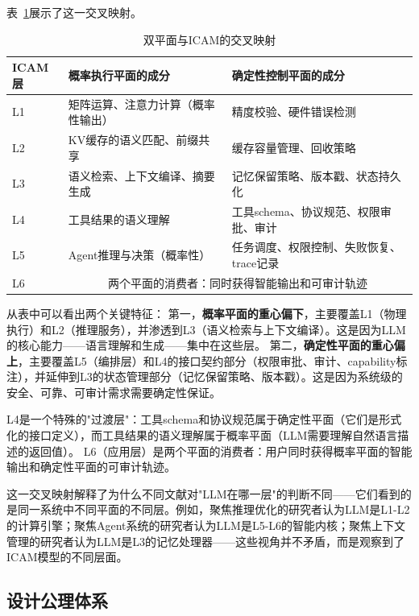 表~\ref{tab:dual-plane-icam}展示了这一交叉映射。

\begin{table}[t]
\centering
\footnotesize
\caption{双平面与ICAM的交叉映射}
\label{tab:dual-plane-icam}
\begin{tabularx}{\textwidth}{p{}p{}p{}}
\toprule
ICAM层 & 概率执行平面的成分 & 确定性控制平面的成分 \\
\midrule
L1 & 矩阵运算、注意力计算（概率性输出） & 精度校验、硬件错误检测 \\
L2 & KV缓存的语义匹配、前缀共享 & 缓存容量管理、回收策略 \\
L3 & 语义检索、上下文编译、摘要生成 & 记忆保留策略、版本戳、状态持久化 \\
L4 & 工具结果的语义理解 & 工具schema、协议规范、权限审批、审计 \\
L5 & Agent推理与决策（概率性） & 任务调度、权限控制、失败恢复、trace记录 \\
L6 & \multicolumn{2}{c}{两个平面的消费者：同时获得智能输出和可审计轨迹} \\
\bottomrule
\end{tabularx}
\end{table}

从表中可以看出两个关键特征：
第一，\textbf{概率平面的重心偏下}，主要覆盖L1（物理执行）和L2（推理服务），并渗透到L3（语义检索与上下文编译）。这是因为LLM的核心能力——语言理解和生成——集中在这些层。
第二，\textbf{确定性平面的重心偏上}，主要覆盖L5（编排层）和L4的接口契约部分（权限审批、审计、capability标注），并延伸到L3的状态管理部分（记忆保留策略、版本戳）。这是因为系统级的安全、可靠、可审计需求需要确定性保证。

L4是一个特殊的"过渡层"：工具schema和协议规范属于确定性平面（它们是形式化的接口定义），而工具结果的语义理解属于概率平面（LLM需要理解自然语言描述的返回值）。
L6（应用层）是两个平面的消费者：用户同时获得概率平面的智能输出和确定性平面的可审计轨迹。

这一交叉映射解释了为什么不同文献对"LLM在哪一层"的判断不同——它们看到的是同一系统中不同平面的不同层。例如，聚焦推理优化的研究者认为LLM是L1-L2的计算引擎\cite{kwon2023pagedattention,zhou2024efficientinference}；聚焦Agent系统的研究者认为LLM是L5-L6的智能内核\cite{openai_codex_overview_2026,anthropic_claudecode_overview_2026}；聚焦上下文管理的研究者认为LLM是L3的记忆处理器\cite{memgpt2023,memoryos2025}——这些视角并不矛盾，而是观察到了ICAM模型的不同层面。

\subsection{设计公理体系}
\label{sec:icam-axioms}

